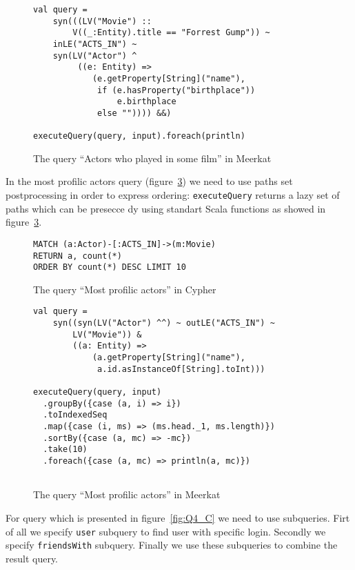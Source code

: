 \begin{figure}[h]
\begin{lstlisting}
val query = 
    syn(((LV("Movie") :: 
        V((_:Entity).title == "Forrest Gump")) ~ 
    inLE("ACTS_IN") ~
    syn(LV("Actor") ^ 
         ((e: Entity) => 
            (e.getProperty[String]("name"),
             if (e.hasProperty("birthplace")) 
                 e.birthplace 
             else "")))) &&)
 
executeQuery(query, input).foreach(println)
\end{lstlisting}
\caption{The query ``Actors who played in some film'' in Meerkat}
\label{fig:Q1_M}
\end{figure}


In the most profilic actors query (figure~\ref{fig:Q2_C}) we need to use paths set postprocessing in order to express ordering: \lstinline{executeQuery} returns a lazy set of paths which can be presecce dy using standart Scala functions as showed in figure~\ref{fig:Q2_C}.

\begin{figure}[h]
\begin{lstlisting}
MATCH (a:Actor)-[:ACTS_IN]->(m:Movie)
RETURN a, count(*)
ORDER BY count(*) DESC LIMIT 10
\end{lstlisting}
\caption{The query ``Most profilic actors'' in Cypher}
\label{fig:Q2_C}
\end{figure}


\begin{figure}[h]
\begin{lstlisting}
val query = 
    syn((syn(LV("Actor") ^^) ~ outLE("ACTS_IN") ~ 
        LV("Movie")) &
        ((a: Entity) => 
            (a.getProperty[String]("name"), 
             a.id.asInstanceOf[String].toInt)))
 
executeQuery(query, input)
  .groupBy({case (a, i) => i})
  .toIndexedSeq
  .map({case (i, ms) => (ms.head._1, ms.length)})
  .sortBy({case (a, mc) => -mc})
  .take(10)
  .foreach({case (a, mc) => println(a, mc)})
  
\end{lstlisting}
\caption{The query ``Most profilic actors'' in Meerkat}
\label{fig:Q2_C}
\end{figure}

For query which is presented in figure~\ref{fig:Q4_C} we need to use subqueries.
Firt of all we specify \lstinline{user} subquery to find user with specific login.
Secondly we specify \lstinline{friendsWith} subquery.
Finally we use these subqueries to combine the result query.

